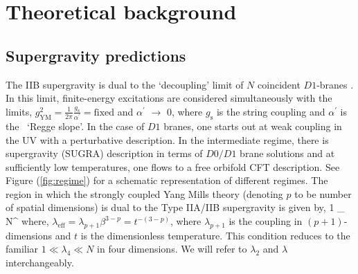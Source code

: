 \section{Theoretical background}
\subsection{Supergravity predictions}

The IIB supergravity is dual to the `decoupling' limit of $N$ coincident $D1$-branes \cite{Itzhaki:1998dd}. In this limit, 
finite-energy excitations 
are considered simultaneously with the limits, 
$g_{\mathrm{YM}}^{2} = \frac{1}{2\pi} \frac{g_{\mathrm{s}}}{\alpha^{\prime}} = \mathrm{fixed}$ and $\alpha^{\prime}$ $\to$ 0, 
where $g_{\mathrm{s}}$ is the 
string coupling and $\alpha^{\prime}$ is the ~`Regge slope'. In the case of $D1$ branes, one starts out at weak coupling in the UV with 
a perturbative description. In the intermediate regime, there is supergravity (SUGRA) description in terms of $D0/D1$ brane solutions and at 
sufficiently low temperatures, one flows to a free orbifold CFT description. See Figure (\ref{fig:regime}) for a schematic representation of 
different regimes. 
The region in which the strongly coupled Yang Mills theory (denoting $p$ to be number of spatial dimensions) is 
dual to the Type IIA/IIB supergravity is given by, 
\beq\label{ineq:validiity} 
1 \ll \lambda_{} \ll N^{} 
\eeq
where,  $\lambda_{\mathrm{eff}} = \lambda_{p+1} \beta^{3-p} = t^{-(3-p)}$, where $\lambda_{p+1}$ is the coupling in 
$(p+1)$-dimensions and $t$ is
the dimensionless temperature. This condition reduces to the familiar $1 \ll \lambda_{4} \ll N$ in four dimensions.
 We will refer to $\lambda_{2}$ and $\lambda$ interchangeably. 

